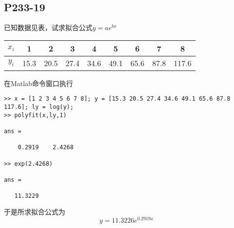 \subsection{P233-19}
已知数据见表，试求拟合公式$y=a e^{b x}$
\begin{center}
\begin{tabular}{c|c c c c c c c c}
$x_i$ & 1    & 2    & 3    & 4    & 5    & 6    & 7    & 8 \\
\hline
$y_i$ & 15.3 & 20.5 & 27.4 & 34.6 & 49.1 & 65.6 & 87.8 & 117.6
\end{tabular}
\end{center}
\begin{SOLVE}
在Matlab命令窗口执行
\begin{lstlisting}
>> x = [1 2 3 4 5 6 7 8]; y = [15.3 20.5 27.4 34.6 49.1 65.6 87.8 117.6]; ly = log(y);
>> polyfit(x,ly,1)

ans =

    0.2919    2.4268

>> exp(2.4268)

ans =

   11.3229
\end{lstlisting}
于是所求拟合公式为
\begin{displaymath}
y = 11.3226 e^{0.2919 x}
\end{displaymath}
\end{SOLVE}